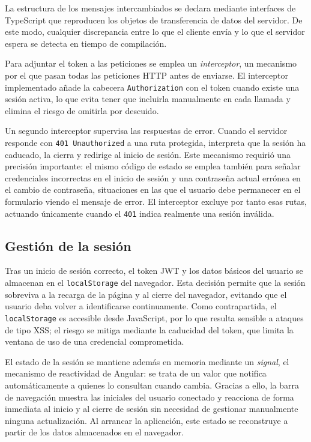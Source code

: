 \documentclass[12pt,a4paper,twoside,openright]{book}
\begin{document}
    La estructura de los mensajes intercambiados se declara mediante interfaces
    de TypeScript que reproducen los objetos de transferencia de datos del
    servidor. De este modo, cualquier discrepancia entre lo que el cliente envía
    y lo que el servidor espera se detecta en tiempo de compilación.

    Para adjuntar el token a las peticiones se emplea un \textit{interceptor},
    un mecanismo por el que pasan todas las peticiones HTTP antes de enviarse.
    El interceptor implementado añade la cabecera \texttt{Authorization} con el
    token cuando existe una sesión activa, lo que evita tener que incluirla
    manualmente en cada llamada y elimina el riesgo de omitirla por descuido.

    Un segundo interceptor supervisa las respuestas de error. Cuando el servidor
    responde con \texttt{401 Unauthorized} a una ruta protegida, interpreta que
    la sesión ha caducado, la cierra y redirige al inicio de sesión. Este
    mecanismo requirió una precisión importante: el mismo código de estado se
    emplea también para señalar credenciales incorrectas en el inicio de sesión
    y una contraseña actual errónea en el cambio de contraseña, situaciones en
    las que el usuario debe permanecer en el formulario viendo el mensaje de
    error. El interceptor excluye por tanto esas rutas, actuando únicamente
    cuando el \texttt{401} indica realmente una sesión inválida.

    \subsection{Gestión de la sesión}

    Tras un inicio de sesión correcto, el token JWT y los datos básicos del
    usuario se almacenan en el \texttt{localStorage} del navegador. Esta
    decisión permite que la sesión sobreviva a la recarga de la página y al
    cierre del navegador, evitando que el usuario deba volver a identificarse
    continuamente. Como contrapartida, el \texttt{localStorage} es accesible
    desde JavaScript, por lo que resulta sensible a ataques de tipo XSS; el
    riesgo se mitiga mediante la caducidad del token, que limita la ventana de
    uso de una credencial comprometida.

    El estado de la sesión se mantiene además en memoria mediante un
    \textit{signal}, el mecanismo de reactividad de Angular: se trata de un
    valor que notifica automáticamente a quienes lo consultan cuando cambia.
    Gracias a ello, la barra de navegación muestra las iniciales del usuario
    conectado y reacciona de forma inmediata al inicio y al cierre de sesión sin
    necesidad de gestionar manualmente ninguna actualización. Al arrancar la
    aplicación, este estado se reconstruye a partir de los datos almacenados en
    el navegador.
\end{document}
